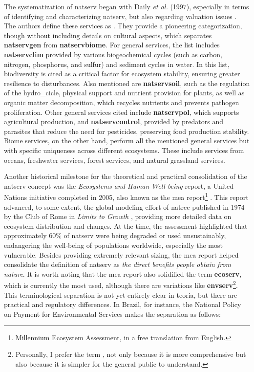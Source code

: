 \documentclass[./main_en.tex]{subfiles}
\begin{document}
\par The systematization of \gls{natserv} began with Daily \textit{et al.} (1997), especially in terms of identifying and characterizing \gls{natserv}, but also regarding valuation issues \cite{daily1997}. The authors define these services as . They provide a pioneering categorization, though without including details on cultural aspects, which separates \textbf{\gls{natservgen}} from \textbf{\gls{natservbiome}}. For general services, the list includes \textbf{\gls{natservclim}} provided by various biogeochemical cycles (such as carbon, nitrogen, phosphorus, and sulfur) and sediment cycles in water. In this list, biodiversity is cited as a critical factor for ecosystem stability, ensuring greater resilience to disturbances. Also mentioned are \textbf{\gls{natservsoil}}, such as the regulation of the \gls{hydro_cicle}, physical support and nutrient provision for plants, as well as organic matter decomposition, which recycles nutrients and prevents pathogen proliferation. Other general services cited include \textbf{\gls{natservpol}}, which supports agricultural production, and \textbf{\gls{natservcontrol}}, provided by predators and parasites that reduce the need for pesticides, preserving food production stability. Biome services, on the other hand, perform all the mentioned general services but with specific uniqueness across different ecosystems. These include services from oceans, freshwater services, forest services, and natural grassland services.

\par Another historical milestone for the theoretical and practical consolidation of the \gls{natserv} concept was the \textit{Ecosystems and Human Well-being} report, a United Nations initiative completed in 2005, also known as the \acrfull{mea} report\footnote{Millennium Ecosystem Assessment, in a free translation from English.} \cite{MEA2005a}. This report advanced, to some extent, the global modeling effort of \gls{natrec} published in 1974 by the Club of Rome in \textit{Limits to Growth} \cite{meadows1974}, providing more detailed data on ecosystem distribution and changes. At the time, the assessment highlighted that approximately 60\% of \gls{natserv} were being degraded or used unsustainably, endangering the well-being of populations worldwide, especially the most vulnerable. Besides providing extremely relevant sizing, the \acrshort{mea} report helped consolidate the definition of \gls{natserv} as \textit{the direct benefits people obtain from nature}. It is worth noting that the \acrshort{mea} report also solidified the term \textbf{\gls{ecoserv}}, which is currently the most used, although there are variations like \textbf{\gls{envserv}}\footnote{Personally, I prefer the term , not only because it is more comprehensive but also because it is simpler for the general public to understand.}. This terminological separation is not yet entirely clear in \gls{teoria}, but there are practical and regulatory differences. In Brazil, for instance, the National Policy on Payment for Environmental Services makes the separation as follows:
\end{document}
